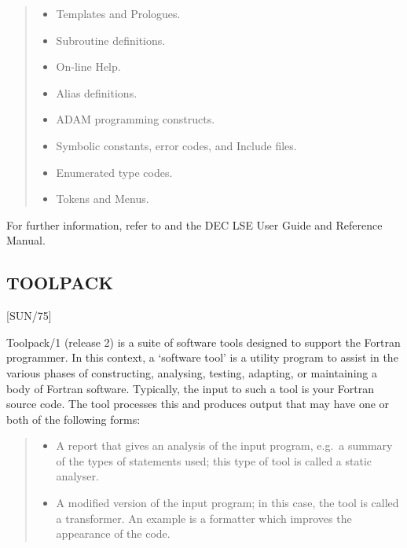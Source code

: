 \begin{small}
\begin{quote}
\begin{itemize}
\item Templates and Prologues.
\item Subroutine definitions.
\item On-line Help.
\item Alias definitions.
\item ADAM programming constructs.
\item Symbolic constants, error codes, and Include files.
\item Enumerated type codes.
\item Tokens and Menus.
\end{itemize}
\end{quote}
\end{small}

For further information, refer to
 and the DEC LSE User Guide and
Reference Manual.

\subsection{TOOLPACK}

\vspace{-10mm}

\hfill [SUN/75]

\vspace{2mm}

Toolpack/1 (release 2) is a suite of software tools designed to support the
Fortran programmer.
In this context, a `software tool' is a utility program to assist in the
various phases of constructing, analysing, testing, adapting, or maintaining
a body of Fortran software.
Typically, the input to such a tool is your Fortran source code.
The tool processes this and produces output that may have one or both of the
following forms:

\begin{small}
\begin{quote}
\begin{itemize}
\item A report that gives an analysis of the input program, e.g.\ a summary of
the types of statements used; this type of tool is called a static analyser.
\item A modified version of the input program; in this case, the tool is
called a transformer.
An example is a formatter which improves the appearance of the code.
\end{itemize}
\end{quote}
\end{small}

